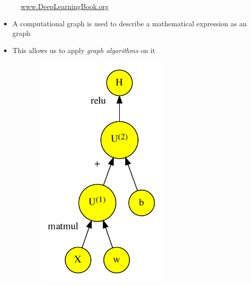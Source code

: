 \documentclass[t]{beamer}
\begin{document}
\begin{frame}
\begin{figure}
\begin{minipage}{0.45\textwidth}
\begin{figure}[]
            \end{figure}
        \end{minipage}
        \caption{\href{http://www.deeplearningbook.org}{www.DeepLearningBook.org}}
    \end{figure}
    \begin{itemize}
        \item A computational graph is used to describe a mathematical expression as an graph
        \item This allows us to apply \emph{graph algorithms} on it
    \end{itemize}
\end{frame}

\begin{frame}
    \begin{figure}
        \centering
        \begin{minipage}{0.45\textwidth}
            \begin{figure}[]
                \centering
                \includegraphics[width=0.7\textwidth]{../plots/computational-graph-c-crop.pdf}

\end{figure}
\end{minipage}
\end{figure}
\end{frame}
\end{document}
